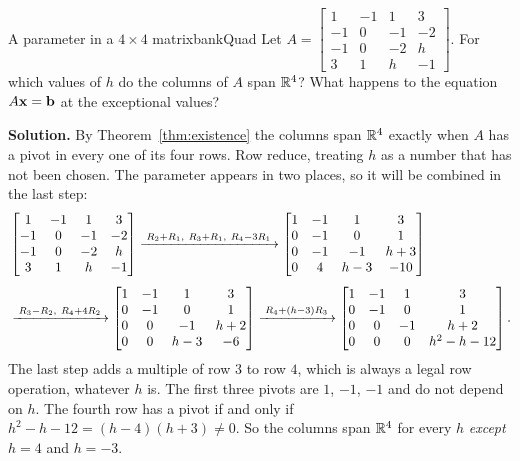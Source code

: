 \documentclass[11pt]{article}
\begin{document}
\begin{exmp}{A parameter in a $4\times4$ matrix}{bankQuad}
Let $A=\begin{bmatrix}1&-1&1&3\\-1&0&-1&-2\\-1&0&-2&h\\3&1&h&-1\end{bmatrix}$. For which values of $h$ do the columns of $A$ span $\mathbb{R}^4$? What happens to the equation $A\mathbf{x}=\mathbf{b}$ at the exceptional values?

\textbf{Solution.} By Theorem~\ref{thm:existence} the columns span $\mathbb{R}^4$ exactly when $A$ has a pivot in every one of its four rows. Row reduce, treating $h$ as a number that has not been chosen. The parameter appears in two places, so it will be combined in the last step:
\begin{align*}
&\begin{bmatrix}1&-1&1&3\\-1&0&-1&-2\\-1&0&-2&h\\3&1&h&-1\end{bmatrix}
\xrightarrow{\;R_2+R_1,\ R_3+R_1,\ R_4-3R_1\;}
\begin{bmatrix}1&-1&1&3\\0&-1&0&1\\0&-1&-1&h+3\\0&4&h-3&-10\end{bmatrix}\\[4pt]
&\xrightarrow{\;R_3-R_2,\ R_4+4R_2\;}
\begin{bmatrix}1&-1&1&3\\0&-1&0&1\\0&0&-1&h+2\\0&0&h-3&-6\end{bmatrix}
\xrightarrow{\;R_4+(h-3)R_3\;}
\begin{bmatrix}1&-1&1&3\\0&-1&0&1\\0&0&-1&h+2\\0&0&0&h^2-h-12\end{bmatrix}.
\end{align*}
The last step adds a multiple of row $3$ to row $4$, which is always a legal row operation, whatever $h$ is. The first three pivots are $1$, $-1$, $-1$ and do not depend on $h$. The fourth row has a pivot if and only if $h^2-h-12=(h-4)(h+3)\neq0$. So the columns span $\mathbb{R}^4$ for every $h$ \emph{except} $h=4$ and $h=-3$.


\end{exmp}
\end{document}
